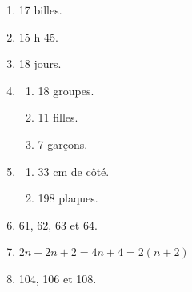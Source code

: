 %
%
  \begin{enumerate}[cols=2]
    \item 17 billes.
    \item 15 h 45.
    \item 18 jours.
    \item
          \begin{enumerate}[label=\arabic*)]
            \item 18 groupes.
            \item 11 filles.
            \item 7 garçons.
          \end{enumerate}
    \item
          \begin{enumerate}[label=\arabic*)]
            \item 33 cm de côté.
            \item 198 plaques.
          \end{enumerate}
    \item 61, 62, 63 et 64.
    \item $2n + 2n + 2 = 4n + 4 = 2(n+2)$
    \item 104, 106 et 108.
  \end{enumerate}
